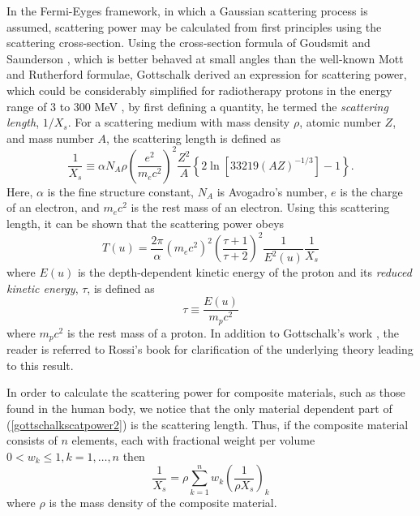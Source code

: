 \documentclass[preprint,times]{elsarticle}
\newcommand{\Eqn}[1]{(#1)} %
\begin{document}
In the Fermi-Eyges framework, in which a Gaussian scattering process is assumed, scattering power may be calculated from first principles using the scattering cross-section. Using the cross-section formula of Goudsmit and Saunderson \citep{gs1,gs2}, which is better behaved at small angles than the well-known Mott \citep{mott} and Rutherford \citep{Rutherford1911} formulae, Gottschalk derived an expression for scattering power, which could be considerably simplified for radiotherapy protons in the energy range of 3 to 300 MeV \citep{gottschalkRadioProtons}, by first defining a quantity, he termed the \emph{scattering length}, $1/X_s$. For a scattering medium with mass density $\rho$, atomic number $Z$, and mass number $A$, the scattering length is defined as
\begin{equation}
\frac{1}{X_s} \equiv \alpha N_A \rho \left( \frac{e^2}{m_ec^2} \right)^2\frac{Z^2}{A}\left\{ 2\ln\left[ 33219(AZ)^{-1/3}\right]-1\right\}. \label{scatteringlength}
\end{equation}
Here, $\alpha$ is the fine structure constant, $N_A$ is Avogadro's number, $e$ is the charge of an electron, and $m_ec^2$ is the rest mass of an electron. Using this scattering length, it can be shown that the scattering power obeys
\begin{equation}
T(u) = \frac{2\pi}{\alpha}\left( m_ec^2 \right)^2\left( \frac{\tau+1}{\tau+2} \right)^2\frac{1}{E^2(u)}\frac{1}{X_s}  \label{gottschalkscatpower2}
\end{equation}
where $E(u)$ is the depth-dependent kinetic energy of the proton and its \emph{reduced kinetic energy}, $\tau$, is defined as
\begin{equation}
\tau \equiv \frac{E(u)}{m_pc^2} \label{reducedkinenergy}
\end{equation}
where $m_pc^2$ is the rest mass of a proton. In addition to Gottschalk's work \citep{gottschalkRadioProtons}, the reader is referred to Rossi's book \citep{rossibook} for clarification of the underlying theory leading to this result.

In order to calculate the scattering power for composite materials, such as those found in the human body, we notice that the only material dependent part of \Eqn{\ref{gottschalkscatpower2}} is the scattering length. Thus, if the composite material consists of $n$ elements, each with fractional weight per volume $0<w_k\leq 1, k=1,\dots,n$ then
\begin{equation}
\frac{1}{X_s} = \rho \sum_{k=1}^n w_k \left( \frac{1}{\rho X_s} \right)_k \label{scatlengthsum}
\end{equation}
where $\rho$ is the mass density of the composite material.
\end{document}
